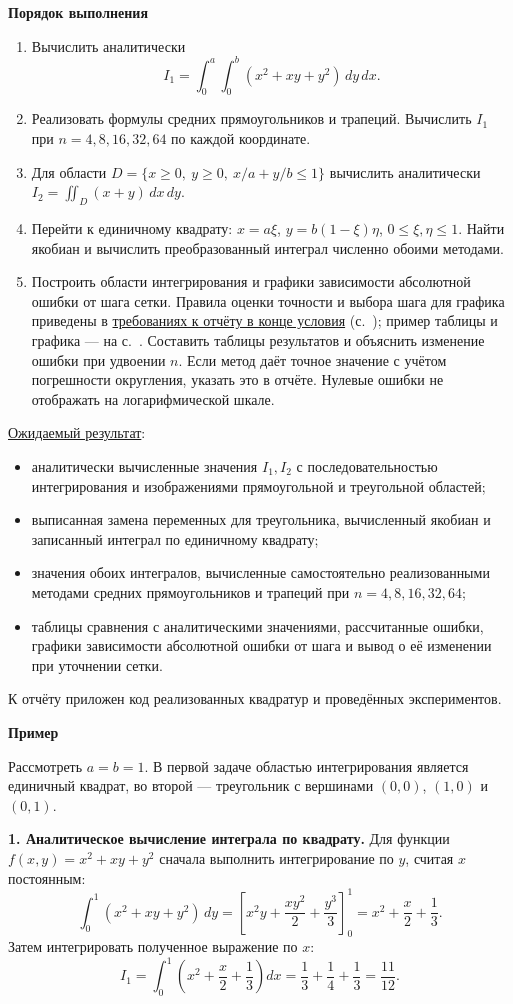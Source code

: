 \documentclass[12pt,a4paper]{article}
\newcommand{\taskhead}[1]{\par\textbf{#1}\par}
\begin{document}
\taskhead{Порядок выполнения}
\begin{enumerate}
\item Вычислить аналитически
\[
I_1=\int_0^a\int_0^b(x^2+xy+y^2)\,dy\,dx.
\]
\item Реализовать формулы средних прямоугольников и трапеций.
Вычислить $I_1$ при $n=4,8,16,32,64$ по каждой координате.
\item Для области $D=\{x\geq0,\ y\geq0,\ x/a+y/b\leq1\}$
вычислить аналитически $I_2=\iint_D(x+y)\,dx\,dy$.
\item Перейти к единичному квадрату:
$x=a\xi$, $y=b(1-\xi)\eta$, $0\leq\xi,\eta\leq1$.
Найти якобиан и вычислить преобразованный интеграл численно обоими методами.
\item Построить области интегрирования и графики зависимости абсолютной ошибки
от шага сетки. Правила оценки точности и выбора шага для графика приведены
в \hyperref[sec:accuracy]{требованиях к отчёту в конце условия}
(с.~\pageref{sec:accuracy}); пример таблицы и графика ---
на с.~\pageref{sec:error-example}.
Составить таблицы результатов и объяснить изменение ошибки при удвоении $n$.
Если метод даёт точное значение с учётом погрешности округления,
указать это в отчёте. Нулевые ошибки не отображать на логарифмической шкале.
\end{enumerate}
\underline{Ожидаемый результат}:
\begin{itemize}
\item аналитически вычисленные значения $I_1,I_2$ с последовательностью
интегрирования и изображениями прямоугольной и треугольной областей;
\item выписанная замена переменных для треугольника, вычисленный якобиан
и записанный интеграл по единичному квадрату;
\item значения обоих интегралов, вычисленные самостоятельно реализованными
методами средних прямоугольников и трапеций при $n=4,8,16,32,64$;
\item таблицы сравнения с аналитическими значениями, рассчитанные ошибки,
графики зависимости абсолютной ошибки от шага и вывод о её изменении
при уточнении сетки.
\end{itemize}
К отчёту приложен код реализованных квадратур и проведённых экспериментов.


\newpage

\taskhead{Пример}
Рассмотреть $a=b=1$. В первой задаче областью интегрирования является
единичный квадрат, во второй --- треугольник с вершинами $(0,0)$, $(1,0)$ и $(0,1)$.

\textbf{1. Аналитическое вычисление интеграла по квадрату.}
Для функции $f(x,y)=x^2+xy+y^2$ сначала выполнить интегрирование по $y$,
считая $x$ постоянным:
\[
\int_0^1(x^2+xy+y^2)\,dy
=\left[x^2y+\frac{xy^2}{2}+\frac{y^3}{3}\right]_0^1
=x^2+\frac{x}{2}+\frac13.
\]
Затем интегрировать полученное выражение по $x$:
\[
I_1=\int_0^1\left(x^2+\frac{x}{2}+\frac13\right)dx
=\frac13+\frac14+\frac13=\frac{11}{12}.
\]
\end{document}
